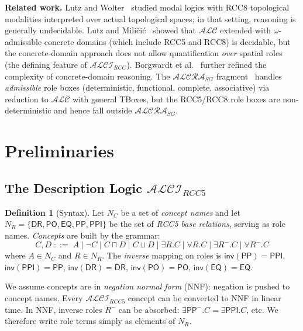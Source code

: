 \documentclass[a4paper,11pt]{article}
\theoremstyle{definition}
\newtheorem{definition}[theorem]{Definition}
\newcommand{\ALC}{\ensuremath{\mathcal{ALC}}}
\newcommand{\ALCIRCC}[1]{\ensuremath{\mathcal{ALCI}_{\mathit{RCC#1}}}}
\newcommand{\ALCRASG}{\ensuremath{\mathcal{ALCRA}_{\mathit{SG}}}}
\newcommand{\NR}{\ensuremath{N_R}}
\newcommand{\NC}{\ensuremath{N_C}}
\newcommand{\DR}{\ensuremath{\mathsf{DR}}}
\newcommand{\PO}{\ensuremath{\mathsf{PO}}}
\newcommand{\EQ}{\ensuremath{\mathsf{EQ}}}
\newcommand{\PP}{\ensuremath{\mathsf{PP}}}
\newcommand{\PPI}{\ensuremath{\mathsf{PPI}}}
\newcommand{\inv}{\ensuremath{\mathsf{inv}}}
\begin{document}
\smallskip
\textbf{Related work.}  Lutz and
Wolter~\cite{LutzWolter2006} studied modal logics with RCC8
topological modalities interpreted over actual topological spaces; in
that setting, reasoning is generally undecidable.  Lutz and
Mili\v{c}i\'{c}~\cite{LutzMilicic2007} showed that $\ALC$ extended
with $\omega$-admissible concrete domains (which include RCC5 and
RCC8) is decidable, but the concrete-domain approach does not allow
quantification \emph{over} spatial roles (the defining feature of
$\ALCIRCC{}$). Borgwardt et al.~\cite{BorgwardtEtAl2024} further
refined the complexity of concrete-domain reasoning.  The
$\ALCRASG$ fragment~\cite{Wessel2000} handles \emph{admissible} role
boxes (deterministic, functional, complete, associative) via reduction
to $\ALC$ with general TBoxes, but the RCC5/RCC8 role boxes are
non-deterministic and hence fall outside $\ALCRASG$.

\section{Preliminaries}
\label{sec:prelim}

\subsection{The Description Logic $\ALCIRCC{5}$}

\begin{definition}[Syntax]
\label{def:syntax}
Let $\NC$ be a set of \emph{concept names} and let $\NR = \{\DR,
\PO, \EQ, \PP, \PPI\}$ be the set of \emph{RCC5 base relations},
serving as role names.  \emph{Concepts} are built by the grammar:
\[
  C,D \;::=\; A \mid \neg C \mid C \sqcap D \mid C \sqcup D
  \mid \exists R.C \mid \forall R.C
  \mid \exists R^-.C \mid \forall R^-.C
\]
where $A \in \NC$ and $R \in \NR$.  The \emph{inverse} mapping on roles is
$\inv(\PP) = \PPI$, $\inv(\PPI) = \PP$, $\inv(\DR) = \DR$,
$\inv(\PO) = \PO$, $\inv(\EQ) = \EQ$.

We assume concepts are in \emph{negation normal form} (NNF): negation
is pushed to concept names.  Every $\ALCIRCC{5}$ concept can be
converted to NNF in linear time.  In NNF, inverse roles $R^-$ can be
absorbed: $\exists \PP^-.C = \exists \PPI.C$, etc.  We therefore write
role terms simply as elements of $\NR$.
\end{definition}
\end{document}
